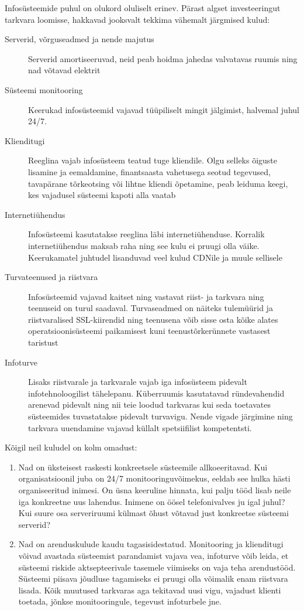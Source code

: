 \documentclass{tufte-book}
\begin{document}
Infosüsteemide puhul on olukord oluliselt erinev. Pärast algset investeeringut tarkvara loomisse, hakkavad jooksvalt tekkima vähemalt järgmised kulud:
\begin{description}
	\item[Serverid, võrguseadmed ja nende majutus] Serverid amortiseeruvad, neid peab hoidma jahedas valvatavas ruumis ning nad võtavad elektrit
	\item[Süsteemi monitooring] Keerukad infosüsteemid vajavad tüüpiliselt mingit jälgimist, halvemal juhul 24/7. 
	\item[Klienditugi] Reeglina vajab infosüsteem teatud tuge kliendile. Olgu selleks õiguste lisamine ja eemaldamine, finantsaasta vahetusega seotud tegevused, tavapärane tõrkeotsing või lihtne kliendi õpetamine, peab leiduma keegi, kes vajadusel süsteemi kapoti alla vaatab
	\item[Internetiühendus] Infosüsteemi kasutatakse reeglina läbi internetiühenduse. Korralik internetiühendus maksab raha ning see kulu ei pruugi olla väike. Keerukamatel juhtudel lisanduvad veel kulud CDNile ja muule sellisele
	\item[Turvateenused ja riistvara] Infosüsteemid vajavad kaitset ning vastavat riist- ja tarkvara ning teenuseid on turul saadaval. Turvaseadmed on näiteks tulemüürid ja riistvaralised SSL-kiirendid ning teenusena võib sisse osta kõike alates operatsioonisüsteemi paikamisest kuni teenustõrkerünnete vastasest taristust  
	\item[Infoturve] Lisaks riistvarale ja tarkvarale vajab iga infosüsteem pidevalt infotehnoloogilist tähelepanu. Küberruumis kasutatavad ründevahendid arenevad pidevalt ning nii teie loodud tarkvaras kui seda toetavates süsteemides tuvastatakse pidevalt turvavigu. Nende vigade järgimine ning tarkvara uuendamine vajavad küllalt spetsiifilist kompetentsti.
\end{description}

Kõigil neil kuludel on kolm omadust:
\begin{enumerate}
	\item Nad on üksteisest raskesti konkreetsele süsteemile allkoeeritavad. Kui organisatsioonil juba on 24/7 monitooringuvõimekus, eeldab see hulka hästi organiseeritud inimesi. On üsna keeruline hinnata, kui palju tööd lisab neile iga konkreetne uus lahendus. Inimene on öösel telefonivalves ju igal juhul? Kui suure osa serveriruumi külmast õhust võtavad just konkreetse süsteemi serverid?
	\item Nad on arenduskulude kaudu tagasisidestatud. Monitooring ja klienditugi võivad avastada süsteemist parandamist vajava vea, infoturve võib leida, et süsteemi riskide aktsepteerivale tasemele viimiseks on vaja teha arendustööd. Süsteemi piisava jõudluse tagamiseks ei pruugi olla võimalik enam riistvara lisada. Kõik muutused tarkvaras aga tekitavad uusi vigu, vajadust klienti toetada, jõnkse monitooringule, tegevust infoturbele jne. 
\end{enumerate}
\end{document}
